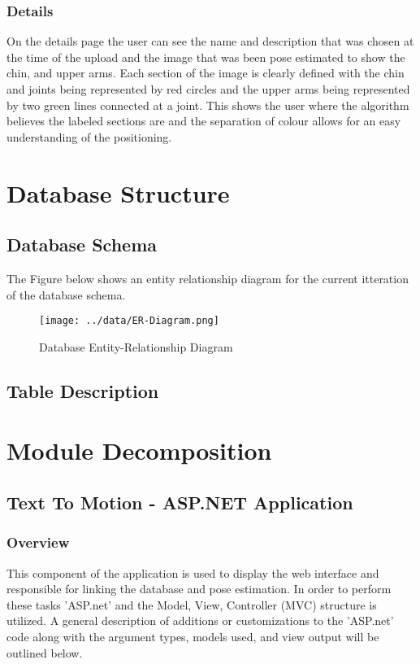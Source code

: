 \documentclass{scrreprt}
\begin{document}
\subsection{Details}
On the details page the user can see the name and description that was chosen at the time of the upload and the image that was been pose estimated to show the chin, and upper arms. Each section of the image is clearly defined with the chin and joints being represented by red circles and the upper arms being represented by two green lines connected at a joint. This shows the user where the algorithm believes the labeled sections are and the separation of colour allows for an easy understanding of the positioning.

\chapter{Database Structure}

\section{Database Schema}
The Figure below shows an entity relationship diagram for the current itteration of the database schema.

\begin{figure}[!ht]
        \caption{Database Entity-Relationship Diagram}
        \label{erDiagram}
        \centering
        \texttt{[image: ../data/ER-Diagram.png]}
\end{figure}

\section{Table Description}

\chapter{Module Decomposition}

\section{Text To Motion - ASP.NET Application}


\subsection{Overview}
This component of the application is used to display the web interface and responsible for linking the database and pose estimation. In order to perform these tasks 'ASP.net' and the Model, View, Controller (MVC) structure is utilized. A general description of additions or customizations to the 'ASP.net' code along with the argument types, models used, and view output will be outlined below.
\end{document}
